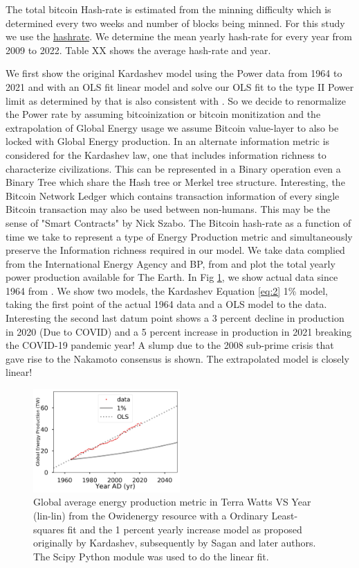 \documentclass[final,5p,times,twocolumn,authoryear]{elsarticle}
\begin{document}
The total bitcoin Hash-rate is estimated from the minning difficulty which is determined every two weeks and number of blocks being minned. For this study we use the \href{https://data.nasdaq.com/data/BCHAIN/HRATE-bitcoin-hash-rate}{hashrate}. We determine the mean yearly hash-rate for every year from 2009 to 2022. Table XX shows the average hash-rate and year. 

We first show the original Kardashev model using the Power data from 1964 to 2021 and with an OLS fit linear model and solve our OLS fit to the type II Power limit as determined by \cite{kar64} that is also consistent with \cite{sagan73}. So we decide to renormalize the Power rate by assuming bitcoinization or bitcoin monitization and the extrapolation of Global Energy usage we assume Bitcoin value-layer to also be locked with Global Energy production. In \cite{sagan73} an alternate information metric is considered for the Kardashev law, one that includes information richness to characterize civilizations. This can be represented in a Binary operation even a Binary Tree which share the Hash tree or Merkel tree structure. Interesting, the Bitcoin Network Ledger which contains transaction information of every single Bitcoin transaction may also be used between non-humans. This may be the sense of "Smart Contracts" by Nick Szabo. The Bitcoin hash-rate as a function of time we take to represent a type of Energy Production metric and simultaneously preserve the Information richness required in our model. We take data complied from the International Energy Agency and BP, from \cite{owidenergy} and plot the total yearly power production available for The Earth. In Fig \ref{fig:kardashev1}, we show actual data since 1964 from \cite{owidenergy}. We show two models, the Kardashev Equation \ref{eq:2} 1\% model, taking the first point of the actual 1964 data and a OLS model to the data. Interesting the second last datum point shows a 3 percent decline in production in 2020 (Due to COVID) and a 5 percent increase in production in 2021 breaking the COVID-19 pandemic year! A slump due to the 2008 sub-prime crisis that gave rise to the Nakamoto consensus is shown. The extrapolated model is closely linear!
\begin{figure}
    \centering
    \includegraphics[width=0.5\textwidth]{figs/fig1_kard.jpg}
    \caption{Global average energy production metric in Terra Watts VS Year (lin-lin) from the Owidenergy resource with a Ordinary Least-squares fit and the 1 percent yearly increase model as proposed originally by Kardashev, subsequently by Sagan and later authors. The Scipy Python module was used to do the linear fit.}
    \label{fig:kardashev1}

\end{figure}
\end{document}
